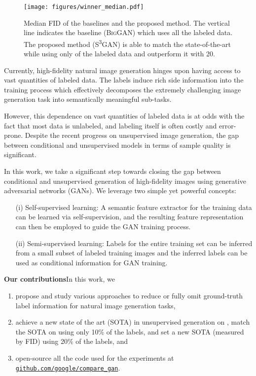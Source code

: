 \documentclass{article}
\newcommand{\tranSSS}{\textsc{S\textsuperscript{3}GAN}}
\newcommand{\biggan}{\textsc{BigGAN}}
\begin{document}
\begin{figure}[t]
\centering
\texttt{[image: figures/winner\_median.pdf]}\vspace{-4mm}
\caption{Median FID of the baselines and the proposed method. The vertical line indicates the baseline (\biggan{}) which uses all the labeled data. The proposed method (\tranSSS) is able to match the state-of-the-art while using only  of the labeled data and outperform it with 20.\vspace{-4mm}}
\end{figure}

Currently, high-fidelity natural image generation hinges upon having access to vast quantities of labeled data. The labels induce rich side information into the training process which effectively decomposes the extremely challenging image generation task into semantically meaningful sub-tasks. 

However, this dependence on vast quantities of labeled data is at odds with the fact that most data is unlabeled, and labeling itself is often costly and error-prone. Despite the recent progress on unsupervised image generation, the gap between conditional and unsupervised models in terms of sample quality is significant. 

In this work, we take a significant step towards closing the gap between conditional and unsupervised generation of high-fidelity images using generative adversarial networks (GANs). We leverage two simple yet powerful concepts:
\begin{enumerate}[itemsep=0pt,topsep=-4pt,parsep=0pt]
\item[(i)] Self-supervised learning: A semantic feature extractor for the training data can be learned via self-supervision, and the resulting feature representation can then be employed to guide the GAN training process.
\item[(ii)] Semi-supervised learning: Labels for the entire training set can be inferred from a small subset of labeled training images and the inferred labels can be used as conditional information for GAN training.
\end{enumerate}

\textbf{Our contributions}\quad In this work, we
\begin{enumerate}[itemsep=0pt,topsep=-5pt,parsep=1pt,leftmargin=5mm]
\item propose and study various approaches to reduce or fully omit ground-truth label information for natural image generation tasks,
\item achieve a new state of the art (SOTA) in unsupervised generation on \imagenet{}, match the SOTA on  \imagenet{} using only 10\% of the labels, and set a new SOTA (measured by FID) using 20\% of the labels, and
\item open-source all the code used for the experiments at \href{https://github.com/google/compare_gan}{\texttt{github.com\slash google\slash compare\_gan}}.
\end{enumerate}
\end{document}

